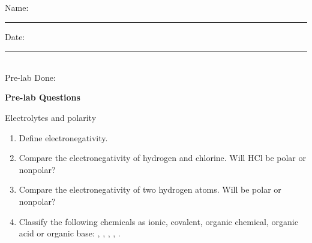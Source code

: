 \documentclass[main.tex]{subfiles}
\begin{document}
\newpage
\setdoublesep{0.35700 em}  %
\setatomsep{1.78500 em}    %
\setbondoffset{0.18265 em} %
\newcommand{\bondwidth}{0.06642 em} %
\setbondstyle{line width = \bondwidth}

\begin{fullwidth}





\begin{multicols}{2}
\begin{tcolorbox}[enhanced jigsaw,breakable,size=title,
colback=mybrown!05,colframe=black,fonttitle=\bfseries,
title=STUDENT INFO,pad at break=1mm, break at=15cm/0pt ]
\vspace{0.2cm}
\noindent Name: \rule{5cm}{0.4pt}Date:\rule{1cm}{0.4pt}\\
Pre-lab Done: \quad
\end{tcolorbox}
\end{multicols}
\hfill
\vspace{0.2cm}
\begin{center}
{\large \bfseries 
Pre-lab Questions 
\par
\Huge
Electrolytes and polarity
\\[5pt] \par}
\vspace{0.2cm}
\end{center}
\par
\noindent
\uline{  \hfill \normalsize \hfill       }

\begin{enumerate}
\item Define electronegativity.
\vspace{3cm}

\item Compare the electronegativity of hydrogen and chlorine. Will HCl be polar or nonpolar?
\vspace{3cm}

\item Compare the electronegativity of two hydrogen atoms. Will  be polar or nonpolar?
\vspace{3cm}


\item Classify the following chemicals as ionic, covalent, organic chemical, organic acid or organic base: ,  , , , .
\vspace{3cm}


\end{enumerate}
\end{fullwidth}
\end{document}
